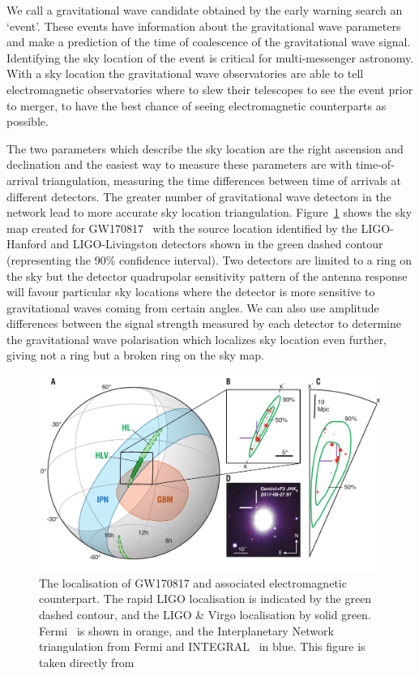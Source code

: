
We call a gravitational wave candidate obtained by the early warning search an `event'. These events have information about the gravitational wave parameters and make a prediction of the time of coalescence of the gravitational wave signal. Identifying the sky location of the event is critical for multi-messenger astronomy. With a sky location the gravitational wave observatories are able to tell electromagnetic observatories where to slew their telescopes to see the event prior to merger, to have the best chance of seeing electromagnetic counterparts as possible.

The two parameters which describe the sky location are the right ascension and declination and the easiest way to measure these parameters are with time-of-arrival triangulation, measuring the time differences between time of arrivals at different detectors. The greater number of gravitational wave detectors in the network lead to more accurate sky location triangulation. Figure~\ref{6:fig:gw170817_skymap} shows the sky map created for GW170817~\cite{gw170817_skymap:2017} with the source location identified by the LIGO-Hanford and LIGO-Livingston detectors shown in the green dashed contour (representing the 90\% confidence interval). Two detectors are limited to a ring on the sky but the detector quadrupolar sensitivity pattern of the antenna response will favour particular sky locations where the detector is more sensitive to gravitational waves coming from certain angles. We can also use amplitude differences between the signal strength measured by each detector to determine the gravitational wave polarisation which localizes sky location even further, giving not a ring but a broken ring on the sky map.
%
\begin{figure}
    \centering
    \includegraphics[width=1.0\linewidth]{images/6_earlywarning/gw170817/GW170817_skymap.pdf}
    \caption{The localisation of GW170817 and associated electromagnetic counterpart. The rapid LIGO localisation is indicated by the green dashed contour, and the LIGO \& Virgo localisation by solid green. Fermi~\cite{Fermi:2022} is shown in orange, and the Interplanetary Network triangulation from Fermi and INTEGRAL~\cite{INTEGRAL:2003} in blue. This figure is taken directly from~\cite{gw170817_skymap:2017}}
    \label{6:fig:gw170817_skymap}
\end{figure}
%

